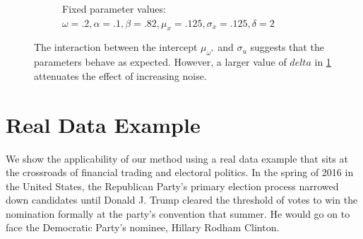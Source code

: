 \documentclass[11pt,3p,review,authoryear]{elsarticle}
\theoremstyle{definition}
\begin{document}
\begin{figure}[!h]
\begin{subfigure}{.44\linewidth}
    \caption{Fixed parameter values: $\omega = .2, \alpha = .1, \beta = .82, \mu_{x} = .125, \sigma_{x} = .125, \delta = 2$}\label{fig:sim_7}
\end{subfigure}

    \caption{The interaction between the intercept $\mu_{\omega^{*}}$ and $\sigma_{u}$ suggests that the parameters behave as expected.  However, a larger value of $delta$ in \ref{fig:sim_7} attenuates the effect of increasing noise.}
    \label{fig:intercept_noise}
  \end{figure}

\clearpage 

\section{Real Data Example}\label{Real Data Example}

We show the applicability of our method using a real data example that sits at the crossroads of financial trading and electoral politics.  In the spring of 2016 in the United States, the Republican Party's primary election process narrowed down candidates until Donald J. Trump cleared the threshold of votes to win the nomination formally at the party's convention that summer.  He would go on to face the Democratic Party's nominee, Hillary Rodham Clinton.   
\end{document}
